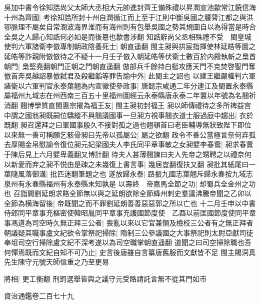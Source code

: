 吳加中書令徐知誥尚父太師大丞相大元帥進封齊王備殊禮以昇潤宣池歙常江饒信海十州為齊國|{
	考徐知誥所封十州自潤循江而上至于江則中斷吳國之腰膂江都之與洪卾脈理不屬矣自常潤波海界淮而有海州則有包舉吳國之勢其規圖自以為得當是時合全吳之人歸心知誥何必如是而後簒也歙書涉翻}
知誥辭尚父丞相殊禮不受　閩皇城使判六軍諸衛李倣專制朝政陰養死士|{
	朝直遥翻}
閩主昶與拱宸指揮使林延皓等圖之延皓等詐親附倣倣待之不疑十一月壬子倣入朝延皓等伏衛士數百於内殿執斬之梟首朝門|{
	梟堅堯翻朝門正朝之門朝直遥翻}
倣部兵千餘持白梃攻應天門不克焚啓聖門奪倣首奔吳越詔暴倣弑君及殺繼韜等罪告諭中外|{
	此閩主之詔也}
以建王繼嚴權判六軍諸衛以六軍判官永泰葉翹為内宣徽使參政事|{
	唐懿宗咸通二年分連江及閩置永泰縣屬福州九域志在州西南三百五十里福州圖經云永泰縣唐永泰二年置以年號為名翹祈消翻}
翹博學質直閩惠宗擢為福王友|{
	閩主昶初封福王}
昶以師傳禮待之多所禆益宫中謂之國翁昶既嗣位驕縱不與翹議國事一旦昶方視事翹衣道士服過庭中趨出|{
	衣於既翻}
昶召還拜之曰軍國事殷久不接對孤之過也翹頓首曰老臣輔導無狀致陛下即位以來無一善可稱願乞骸骨昶曰先帝以孤屬公|{
	屬之欲翻}
政令不善公當極言奈何弃孤去厚賜金帛慰諭令復位昶元妃梁國夫人李氏同平章事敏之女昶嬖李春鷰|{
	昶求春鷰于陳后見上六月嬖卑義翻又博計翻}
待夫人甚薄翹諫曰夫人先帝之甥聘之以禮奈何以新愛而弃之昶不悦由是疎之未幾復上書言事|{
	幾居豈翻復扶又翻}
昶批其紙尾曰一葉隨風落御溝|{
	批匹迷翻筆題之也}
遂放歸永泰|{
	路振九國志葉翹斥歸永春按九域志泉州有永春縣福州有永泰縣未知孰是}
以壽終　帝嘉馬全節之功|{
	却蜀兵全金州之功也}
召詣闕劉延朗求賂全節無以與之延朗欲除全節絳州刺史羣議沸騰帝聞之乙卯以全節為横海留後|{
	帝既聞之而不罪劉延朗善善惡惡郭之所以亡也}
十二月壬申以中書侍郎同平章事充樞密使韓昭胤同平章事充護國節度使　乙酉以前匡國節度使同平章事馮道為司空時久無正拜三公者|{
	喪亂以來以它官兼領及檢校三公者有之無正拜者}
朝議疑其職事盧文紀欲令掌祭祀掃除|{
	隋制三公參議國之大事祭祀則太尉亞獻司徒奉俎司空行掃除盧文紀不深考遂以為司空職掌朝直遥翻}
道聞之曰司空掃除職也吾何憚焉既而文紀自知不可乃止|{
	史言後唐雖自言纂唐舊服而文獻皆不足}
閩主賜洞真先生陳守元號天師信重之乃至更易

將相|{
	更工衡翻}
刑罰選舉皆與之議守元受賂請託言無不從其門如市

資治通鑑卷二百七十九
